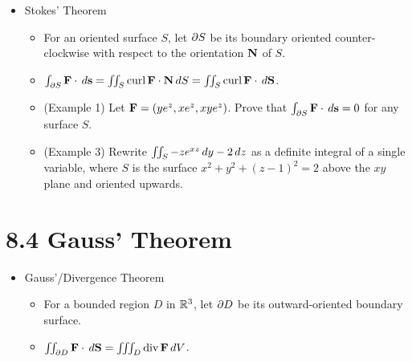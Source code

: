 \documentclass[11pt]{article}
\begin{document}
\begin{itemize}
  \item Stokes' Theorem
    \begin{itemize}
      \item For an oriented surface \(S\), let \(\partial S\) be its
        boundary oriented counter-clockwise with respect to the orientation
        \(\mathbf{N}\) of \(S\).
      \item
        \(
          \int_{\partial S}\mathbf{F}\cdot\,d\mathbf{s}
            =
          \iint_S \textrm{curl}\, \mathbf{F}\cdot \mathbf{N} \,d S
            =
          \iint_S \textrm{curl}\, \mathbf{F}\cdot \,d \mathbf{S}
        \).
      \item (Example 1) Let \(\mathbf{F}=(ye^z,xe^z,xye^z)\).
        Prove that \(\int_{\partial S}\mathbf{F}\cdot\,d\mathbf{s}=0\)
        for any surface \(S\).
      \item (Example 3) Rewrite
        \(\iint_{S} -ze^{xz}\,d y-2\,d z\)
        as a definite integral of a single variable,
        where \(S\) is the surface \(x^2+y^2+(z-1)^2=2\) above the \(xy\)
        plane and oriented upwards.
    \end{itemize}
\end{itemize}

\section*{8.4 Gauss' Theorem}

\begin{itemize}
  \item Gauss'/Divergence Theorem
    \begin{itemize}
      \item For a bounded region \(D\) in \(\mathbb R^3\), let \(\partial D\) be its
        outward-oriented boundary surface.
      \item
        \(
          \iint_{\partial D}\mathbf{F}\cdot\,d\mathbf{S}
            =
          \iiint_D \textrm{div}\,\mathbf{F}\,d V
        \).
    \end{itemize}
\end{itemize}


\end{document}
